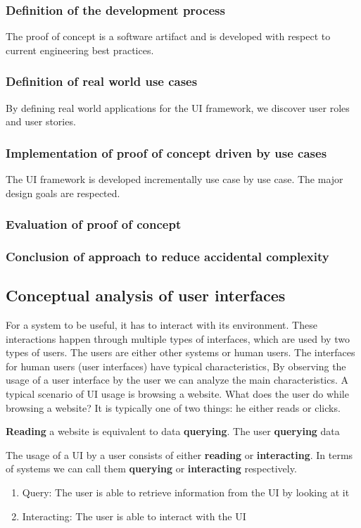\subsubsection{Definition of the development process}
The proof of concept is a software artifact and is developed with respect to current engineering best practices.

\subsubsection{Definition of real world use cases}
By defining real world applications for the UI framework, we discover user roles and user stories.

\subsubsection{Implementation of proof of concept driven by use cases}
The UI framework is developed incrementally use case by use case. The major design goals are respected.

\subsubsection{Evaluation of proof of concept}

\subsubsection{Conclusion of approach to reduce accidental complexity}

\subsection{Conceptual analysis of user interfaces}
For a system to be useful, it has to interact with its environment. These interactions happen through multiple types of interfaces, which are used by two types of users. The users are either other systems or human users.
The interfaces for human users (user interfaces) have typical characteristics,
By observing the usage of a user interface by the user we can analyze the main characteristics. A typical scenario of UI usage is browsing a website. What does the user do while browsing a website? It is typically one of two things: he either reads or clicks.

\textbf{Reading} a website is equivalent to data \textbf{querying}. The user \textbf{querying} data

The usage of a UI by a user consists of either \textbf{reading} or \textbf{interacting}. In terms of systems we can call them \textbf{querying} or \textbf{interacting} respectively.
\begin{enumerate}
  \item Query: The user is able to retrieve information from the UI by looking at it
  \item Interacting: The user is able to interact with the UI
\end{enumerate}

